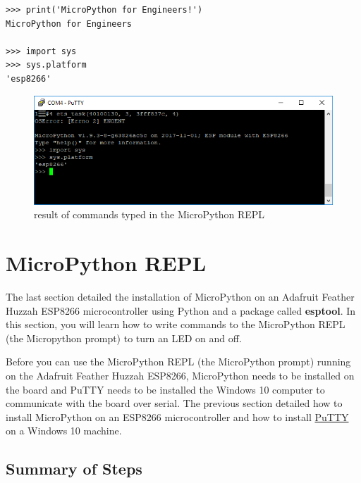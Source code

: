 \documentclass{book}
\makeatletter
\def\maxwidth{\ifdim\Gin@nat@width>\linewidth\linewidth
    \else\Gin@nat@width\fi}
\let\Oldincludegraphics\includegraphics
\renewcommand{\includegraphics}[1]{\Oldincludegraphics[width=.8\maxwidth]{#1}}
\makeatother
\begin{document}
\begin{lstlisting}
>>> print('MicroPython for Engineers!')
MicroPython for Engineers

>>> import sys
>>> sys.platform
'esp8266'
\end{lstlisting}

\begin{figure}
\centering
\includegraphics{images/sys_dot_platform.PNG}
\caption{result of commands typed in the MicroPython REPL}
\end{figure}
    




    
        \section{MicroPython REPL}\label{micropython-repl}
    




    
        The last section detailed the installation of MicroPython on an Adafruit
Feather Huzzah ESP8266 microcontroller using Python and a package called
\textbf{esptool}. In this section, you will learn how to write commands
to the MicroPython REPL (the Micropython prompt) to turn an LED on and
off.

Before you can use the MicroPython REPL (the MicroPython prompt) running
on the Adafruit Feather Huzzah ESP8266, MicroPython needs to be
installed on the board and PuTTY needs to be installed the Windows 10
computer to communicate with the board over serial. The previous section
detailed how to install MicroPython on an ESP8266 microcontroller and
how to install \href{https://www.putty.org/}{PuTTY} on a Windows 10
machine.
    




    
        \subsection{Summary of Steps}\label{summary-of-steps}
    
\end{document}
